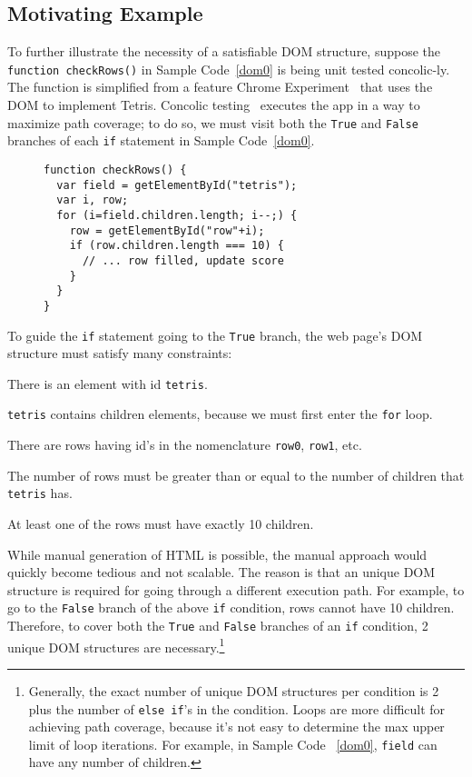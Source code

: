 \subsection{Motivating Example}
To further illustrate the necessity of a satisfiable DOM structure, suppose the {\tt function checkRows()} in Sample Code~\ref{dom0} is being unit tested concolic-ly.  
The function is simplified from a feature Chrome Experiment~\cite{domtris} that uses the DOM to implement Tetris.  
Concolic testing~\cite{cute} executes the app in a way to maximize path coverage; to do so, we must visit both the {\tt True} and {\tt False} branches of each {\tt if} statement in Sample Code~\ref{dom0}.
\begin{figure}
\begin{lstlisting}[caption=Example code whose tests and execution depend on the Document Object Model having a precise tree structure. {\tt getElementById()} is equivalent to {\tt document.getElementById()}.,label=dom0]
function checkRows() {
  var field = getElementById("tetris"); 
  var i, row;
  for (i=field.children.length; i--;) {
    row = getElementById("row"+i);
    if (row.children.length === 10) {
      // ... row filled, update score
    }
  }
}
\end{lstlisting}
\end{figure}

To guide the {\tt if} statement going to the {\tt True} branch, the web page's DOM structure must satisfy many constraints:
\begin {compactitem}
\item There is an element with id {\tt tetris}.
\item {\tt tetris} contains children elements, because we must first enter the {\tt for} loop.
\item There are rows having id's in the nomenclature {\tt row0}, {\tt row1}, etc.
\item The number of rows must be greater than or equal to the number of children that {\tt tetris} has.
\item At least one of the rows must have exactly 10 children.
\end {compactitem}

While manual generation of HTML is possible, the manual approach would quickly become tedious and not scalable.  
The reason is that an unique DOM structure is required for going through a different execution path.
For example, to go to the {\tt False} branch of the above {\tt if} condition, rows cannot have 10 children.
Therefore, to cover both the {\tt True} and {\tt False} branches of an {\tt if} condition, 2 unique DOM structures are necessary.\footnote{Generally, the exact number of unique DOM structures per condition is 2 plus the number of {\tt else if}'s in the condition.  Loops are more difficult for achieving path coverage, because it's not easy to determine the max upper limit of loop iterations.  For example, in Sample Code ~\ref{dom0}, {\tt field} can have any number of children.}

